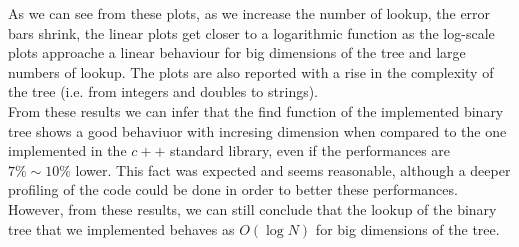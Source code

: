 \documentclass[a4paper,12pt,oneside]{article}
\begin{document}
\begin{figure}
  \begin{center}
  \end{center}
\end{figure}

As we can see from these plots, as we increase the number of lookup, the error bars shrink, the linear plots get closer to a logarithmic function as the log-scale plots approache a linear behaviour for big dimensions of the tree and large numbers of lookup. The plots are also reported with a rise in the complexity of the  tree (i.e. from integers and doubles to strings).\\

From these results we can infer that the find function of the implemented binary tree shows a good behaviuor with incresing dimension when compared to the one implemented in the $c++$ standard library, even if the performances are $7\% \sim  10\%$ lower. This fact was expected and seems reasonable, although a deeper profiling of the code could be done in order to better these performances. However, from these results, we can still conclude that the lookup of the binary tree that we implemented behaves as $O(\log{N})$ for big dimensions of the tree.\\
\end{document}
